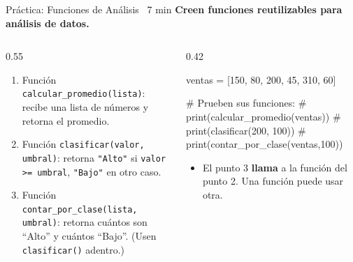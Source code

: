 \documentclass[aspectratio=169, 11pt]{beamer}
\begin{document}
\begin{frame}[fragile,shrink=25]{Práctica: Funciones de Análisis \hfill
    {\normalsize\color{arcaRed}\faClock\ 7 min}}
  \vspace{-6pt}
  {\small\color{arcaDark}\bfseries
    Creen funciones reutilizables para análisis de datos.}

  \vspace{4pt}
  \begin{columns}[T]
    \begin{column}{0.55\textwidth}
      {\footnotesize
      \begin{enumerate}\setlength{\itemsep}{4pt}
        \item Función \texttt{calcular\_promedio(lista)}:
              recibe una lista de números y retorna
              el promedio.
        \item Función \texttt{clasificar(valor, umbral)}:
              retorna \texttt{"Alto"} si \texttt{valor >= umbral},
              \texttt{"Bajo"} en otro caso.
        \item Función \texttt{contar\_por\_clase(lista, umbral)}:
              retorna cuántos son ``Alto'' y cuántos ``Bajo''.
              (Usen \texttt{clasificar()} adentro.)
      \end{enumerate}
      }
    \end{column}

    \begin{column}{0.42\textwidth}
      \begin{pyblock}
ventas = [150, 80, 200, 45, 310, 60]

# Prueben sus funciones:
# print(calcular_promedio(ventas))
# print(clasificar(200, 100))
# print(contar_por_clase(ventas,100))
      \end{pyblock}

      {\footnotesize\color{textMuted}
      \begin{itemize}\setlength{\itemsep}{3pt}
        \item[{\color{arcaRed}\scriptsize\faLightbulb}]
          El punto 3 \textbf{llama} a la función
          del punto 2. Una función puede
          usar otra.
      \end{itemize}
      }
    \end{column}
  \end{columns}
\end{frame}
\end{document}
